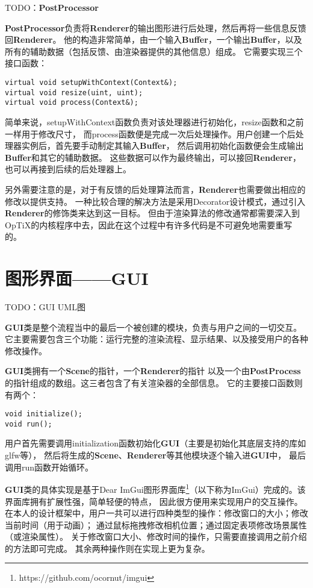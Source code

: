 TODO：\textbf{PostProcessor}

\textbf{PostProcessor}负责将\textbf{Renderer}的输出图形进行后处理，然后再将一些信息反馈回\textbf{Renderer}。
他的构造非常简单，由一个输入\textbf{Buffer}，一个输出\textbf{Buffer}，以及所有的辅助数据（包括反馈、由渲染器提供的其他信息）组成。
它需要实现三个接口函数：

\lstset{language=C++}
\begin{lstlisting}
virtual void setupWithContext(Context&);
virtual void resize(uint, uint);
virtual void process(Context&);
\end{lstlisting}

简单来说，setupWithContext函数负责对该处理器进行初始化，resize函数和之前一样用于修改尺寸，
而process函数便是完成一次后处理操作。用户创建一个后处理器实例后，首先要手动制定其输入\textbf{Buffer}，
然后调用初始化函数便会生成输出\textbf{Buffer}和其它的辅助数据。
这些数据可以作为最终输出，可以接回\textbf{Renderer}，也可以再接到后续的后处理器上。

另外需要注意的是，对于有反馈的后处理算法而言，\textbf{Renderer}也需要做出相应的修改以提供支持。
一种比较合理的解决方法是采用Decorator设计模式，通过引入\textbf{Renderer}的修饰类来达到这一目标。
但由于渲染算法的修改通常都需要深入到OpTiX的内核程序中去，因此在这个过程中有许多代码是不可避免地需要重写的。

\section{图形界面——GUI}

TODO：GUI UML图

\textbf{GUI}类是整个流程当中的最后一个被创建的模块，负责与用户之间的一切交互。
它主要需要包含三个功能：运行完整的渲染流程、显示结果、以及接受用户的各种修改操作。

\textbf{GUI}类拥有一个\textbf{Scene}的指针，一个\textbf{Renderer}的指针
以及一个由\textbf{PostProcess}的指针组成的数组。这三者包含了有关渲染器的全部信息。
它的主要接口函数则有两个：
\lstset{language=C++}
\begin{lstlisting}
void initialize();
void run();
\end{lstlisting}

用户首先需要调用initialization函数初始化\textbf{GUI}（主要是初始化其底层支持的库如glfw等），
然后将生成的\textbf{Scene}、\textbf{Renderer}等其他模块逐个输入进\textbf{GUI}中，
最后调用run函数开始循环。

\textbf{GUI}类的具体实现是基于Dear ImGui图形界面库\footnote{https://github.com/ocornut/imgui}（以下称为ImGui）完成的。该界面库拥有扩展性强，简单轻便的特点，
因此很方便用来实现用户的交互操作。在本人的设计框架中，用户一共可以进行四种类型的操作：修改窗口的大小；修改当前时间（用于动画）；
通过鼠标拖拽修改相机位置；通过固定表项修改场景属性（或渲染属性）。
关于修改窗口大小、修改时间的操作，只需要直接调用之前介绍的方法即可完成。
其余两种操作则在实现上更为复杂。


